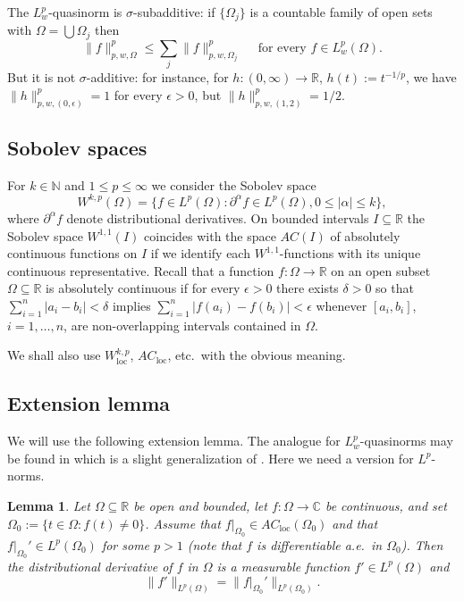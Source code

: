\documentclass[12pt]{amsart}
\theoremstyle{plain}
\newtheorem{lemma}{Lemma}
\theoremstyle{definition}
\numberwithin{equation}{section}
\let\on=\operatorname
\begin{document}
The $L^p_w$-quasinorm is ${\sigma}$-subadditive: if $\{{\Omega}_j\}$ is a countable family of open sets with 
${\Omega} = \bigcup {\Omega}_j$ then 
\begin{equation}
  \|f\|^p_{p,w,{\Omega}}  \le \sum_j \|f\|^p_{p,w,{\Omega}_j} \quad \text{ for every } f \in L^p_w({\Omega}).
\end{equation}
But it is not ${\sigma}$-additive:
for instance, for $h : (0,\infty) \to {\mathbb{R}}$, $h(t):= t^{-1/p}$, we have  
$\|h\|_{p,w,(0,{\epsilon})}^p = 1$ for every ${\epsilon}>0$,  
but $\|h\|_{p,w,(1,2)}^p = 1/2$.

\subsection{Sobolev spaces}

For $k \in {\mathbb{N}}$ and $1 \le p \le \infty$ we consider the Sobolev space
\[
  W^{k,p}({\Omega}) = \{f \in L^p({\Omega}) : {\partial}^{\alpha} f \in L^p({\Omega}), 0 \le |{\alpha}| \le k\},
\]
where ${\partial}^{\alpha} f$ denote distributional derivatives. On bounded intervals $I \subseteq {\mathbb{R}}$ the Sobolev space $W^{1,1}(I)$ 
coincides with the space $AC(I)$ of absolutely continuous functions on $I$
if we identify each $W^{1,1}$-functions with its unique continuous representative. 
Recall that a function $f : {\Omega} \to {\mathbb{R}}$ on an open subset ${\Omega} \subseteq {\mathbb{R}}$ 
is absolutely continuous if for every ${\epsilon}>0$ there exists ${\delta}>0$ so that  
$\sum_{i=1}^n |a_i -b_i| < {\delta}$ implies $\sum_{i=1}^n |f(a_i) -f(b_i)| < {\epsilon}$ whenever $[a_i,b_i]$, $i =1,\ldots,n$, 
are non-overlapping intervals contained in ${\Omega}$.

We shall also use $W^{k,p}_{\on{loc}}$, $AC_{\on{loc}}$, etc.\ with the obvious meaning.

\subsection{Extension lemma}

We will use the following extension lemma. The analogue for $L^p_w$-quasinorms may be found in \cite[Lemma 2.1]{ParusinskiRainerAC}
which is a slight generalization of \cite[Lemma 3.2]{GhisiGobbino13}. Here we need a version for $L^p$-norms.  

\begin{lemma} \label{lem:extend}
  Let ${\Omega} \subseteq {\mathbb{R}}$ be open and bounded, let $f : {\Omega} \to {\mathbb{C}}$ be continuous, and set ${\Omega}_0 := \{t \in {\Omega} : f(t) \ne 0\}$.  
  Assume that $f|_{{\Omega}_0} \in AC_{\on{loc}}({\Omega}_0)$ and that $f|_{{\Omega}_0}' \in L^p({\Omega}_0)$ for some $p>1$ 
  (note that $f$ is differentiable a.e.\ in ${\Omega}_0$).
  Then the distributional derivative of $f$ in ${\Omega}$ is a measurable function $f' \in L^p({\Omega})$ and 
  \begin{equation} \label{eq:extend}
  \|f'\|_{L^p({\Omega})} = \|f|_{{\Omega}_0}'\|_{L^p({\Omega}_0)}.
  \end{equation}
\end{lemma}
\end{document}
